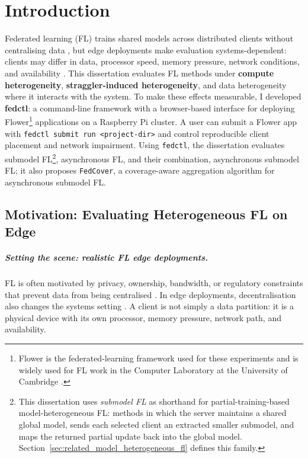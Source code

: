 \chapter{Introduction}
\label{chap:introduction}

Federated learning (FL) trains shared models across distributed clients without centralising data \parencite{mcmahan2017fedavg}, but edge deployments make evaluation systems-dependent: clients may differ in data, processor speed, memory pressure, network conditions, and availability \parencite{bonawitz2019towards,lai2022fedscale}. This dissertation evaluates FL methods under \textbf{compute heterogeneity}, \textbf{straggler-induced heterogeneity}, and data heterogeneity where it interacts with the system. To make these effects measurable, I developed \textbf{fedctl}: a command-line framework with a browser-based interface for deploying Flower\footnote{Flower is the federated-learning framework used for these experiments and is widely used for FL work in the Computer Laboratory at the University of Cambridge \parencite{beutel2022flower}.} applications on a Raspberry Pi cluster. A user can submit a Flower app with \texttt{fedctl submit run <project-dir>} and control reproducible client placement and network impairment. Using \texttt{fedctl}, the dissertation evaluates submodel FL\footnote{This dissertation uses \emph{submodel FL} as shorthand for partial-training-based model-heterogeneous FL: methods in which the server maintains a shared global model, sends each selected client an extracted smaller submodel, and maps the returned partial update back into the global model. Section~\ref{sec:related_model_heterogeneous_fl} defines this family.}, asynchronous FL, and their combination, asynchronous submodel FL; it also proposes \texttt{FedCover}, a coverage-aware aggregation algorithm for asynchronous submodel FL.

\section{Motivation: Evaluating Heterogeneous FL on Edge}

\paragraph{Setting the scene: realistic FL edge deployments.}
FL is often motivated by privacy, ownership, bandwidth, or regulatory constraints that prevent data from being centralised \parencite{kairouz2021advances,wang2021field}. In edge deployments, decentralisation also changes the systems setting \parencite{bonawitz2019towards}. A client is not simply a data partition: it is a physical device with its own processor, memory pressure, network path, and availability. 

